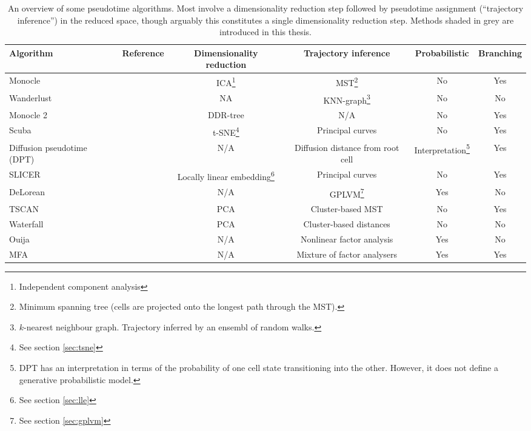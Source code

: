 \begin{sidewaystable}
  \centering
\begin{tabular}{|lccccc|}
\hline
Algorithm & Reference & Dimensionality reduction & Trajectory inference & Probabilistic & Branching \\
\hline
Monocle & \cite{Trapnell2014-xi} & ICA\footnote{Independent component analysis} &
MST\footnote{Minimum spanning tree (cells are projected onto the longest path through the MST).} & No & Yes \\
Wanderlust & \cite{Bendall2014-rc} & NA & KNN-graph\footnote{$k$-nearest neighbour graph. Trajectory inferred by an ensembl of random walks.} & No & No \\
Monocle 2 & \cite{Qiu2017-eu} & DDR-tree & N/A & No & Yes \\
Scuba & \cite{Marco2014-ug} & t-SNE\footnote{See section \ref{sec:tsne}} & Principal curves & No & Yes \\
Diffusion pseudotime (DPT) & \cite{Haghverdi2016-eg} & N/A & Diffusion distance from root cell &
Interpretation\footnote{DPT has an interpretation in terms of the probability of one cell state transitioning into the other. However, it does not define a generative probabilistic model.} & Yes \\
SLICER & \cite{welch2016slicer} & Locally linear embedding\footnote{See section \ref{sec:lle}} & Principal curves & No & Yes \\
DeLorean & \cite{reid2016pseudotime} & N/A & GPLVM\footnote{See section \ref{sec:gplvm}} & Yes & No \\
TSCAN & \cite{Ji2016-gx} & PCA & Cluster-based MST & No & Yes \\
Waterfall & \cite{shin2015single} & PCA & Cluster-based distances & No & No \\
\rowcolor{Gray}
Ouija & \cite{Campbell2016-ys} & N/A & Nonlinear factor analysis & Yes & No \\
\rowcolor{Gray}
MFA & \cite{campbell2017probabilistic} & N/A & Mixture of factor analysers & Yes & Yes \\
\hline
\end{tabular}
\caption{An overview of some pseudotime algorithms. Most involve a dimensionality reduction step followed by pseudotime assignment (``trajectory inference'') in the reduced space, though arguably this constitutes a single dimensionality reduction step. Methods shaded in grey are introduced in this thesis.} \label{tbl:pseudotimecomparison}
\end{sidewaystable}

